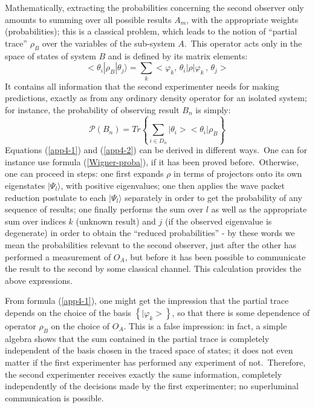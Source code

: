 \documentclass[12pt,onecolumn]{article}%
\begin{document}
Mathematically, extracting the probabilities concerning the second observer
only amounts to summing over all possible results $A_{m}$, with the
appropriate weights (probabilities); this is a classical problem, which leads
to the notion of ``partial trace'' $\rho_{B}$ over the variables of the
sub-system $A$.\ This operator acts only in the space of states of system $B$
and is defined by its matrix elements:%
\begin{equation}
<\theta_{i}|\rho_{B}|\theta_{j}\rangle = \sum_{k}<\varphi_{k},\,\theta_{i}%
|\rho|\varphi_{k}\,,\,\theta_{j}> \label{app4-1}%
\end{equation}
It contains all information that the second experimenter needs for making
predictions, exactly as from any ordinary density operator for an isolated
system; for instance, the probability of observing result $B_{n}$ is simply:%
\begin{equation}
\mathcal{P}(B_{n})=Tr\left\{  \sum_{i\in D_{n}}|\theta_{i}><\theta_{i}%
|\rho_{B}\right\}  \label{app4-2}%
\end{equation}
Equations (\ref{app4-1}) and (\ref{app4-2}) can be derived in different
ways.\ One can for instance use formula (\ref{Wigner-proba}), if it has been
proved before.\ Otherwise, one can proceed in steps: one first expands $\rho$
in terms of projectors onto its own eigenstates $|\Psi_{l}\rangle$, with positive
eigenvalues; one then applies the wave packet reduction postulate to each
$|\Psi_{l}\rangle$ separately in order to get the probability of any sequence of
results; one finally performs the sum over $l$ as well as the appropriate sum
over indices $k$ (unknown result) and $j$ (if the observed eigenvalue is
degenerate) in order to obtain the ``reduced probabilities'' - by these words
we mean the probabilities relevant to the second observer, just after the
other has performed a measurement of $O_{A}$, but before it has been possible
to communicate the result to the second by some classical channel. This
calculation provides the above expressions.

From formula (\ref{app4-1}), one might get the impression that the partial
trace depends on the choice of the basis $\left\{  |\varphi_{k}>\right\}
$, so that there is some dependence of operator $\rho_{B}$ on the choice of
$O_{A}$. This is a false impression: in fact, a simple algebra shows that the
sum contained in the partial trace is completely independent of the basis
chosen in the traced space of states; it does not even matter if the first
experimenter has performed any experiment of not.\ Therefore, the second
experimenter receives exactly the same information, completely independently
of the decisions made by the first experimenter; no superluminal communication
is possible.
\end{document}
